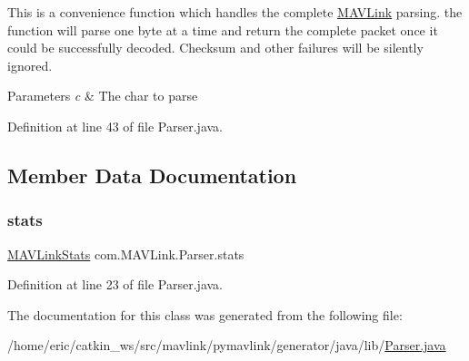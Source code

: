 This is a convenience function which handles the complete \mbox{\hyperlink{namespacecom_1_1MAVLink}{M\+A\+V\+Link}} parsing. the function will parse one byte at a time and return the complete packet once it could be successfully decoded. Checksum and other failures will be silently ignored.


\begin{DoxyParams}{Parameters}
{\em c} & The char to parse \\
\hline
\end{DoxyParams}


Definition at line 43 of file Parser.\+java.



\subsection{Member Data Documentation}
\mbox{\label{classcom_1_1MAVLink_1_1Parser_a877d3b72d9f431b5adca695feb5b7496}} 
\subsubsection{\texorpdfstring{stats}{stats}}
{\footnotesize\ttfamily \mbox{\hyperlink{classcom_1_1MAVLink_1_1Messages_1_1MAVLinkStats}{M\+A\+V\+Link\+Stats}} com.\+M\+A\+V\+Link.\+Parser.\+stats}



Definition at line 23 of file Parser.\+java.



The documentation for this class was generated from the following file\+:\begin{DoxyCompactItemize}
\item 
/home/eric/catkin\+\_\+ws/src/mavlink/pymavlink/generator/java/lib/\mbox{\hyperlink{Parser_8java}{Parser.\+java}}\end{DoxyCompactItemize}

